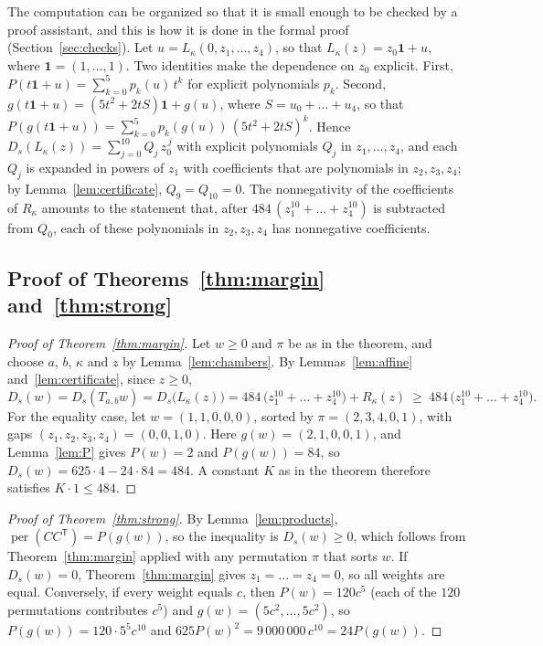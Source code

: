\documentclass[11pt,a4paper]{article}
\theoremstyle{definition}
\theoremstyle{remark}
\newcommand{\per}{\operatorname{per}}
\newcommand{\T}{\mathsf{T}}
\begin{document}
The computation can be organized so that it is small enough to be checked by a proof assistant, and this is how it is
done in the formal proof (Section~\ref{sec:checks}). Let $u=L_\kappa(0,z_1,\dots,z_4)$, so that
$L_\kappa(z)=z_0\mathbf 1+u$, where $\mathbf 1=(1,\dots,1)$. Two identities make the dependence on $z_0$
explicit. First, $P(t\mathbf1+u)=\sum_{k=0}^5p_k(u)\,t^k$ for explicit polynomials $p_k$. Second,
$g(t\mathbf1+u)=(5t^2+2tS)\mathbf1+g(u)$, where $S=u_0+\dots+u_4$, so that
$P(g(t\mathbf1+u))=\sum_{k=0}^5p_k(g(u))\,(5t^2+2tS)^k$. Hence $D_s(L_\kappa(z))=\sum_{j=0}^{10}Q_j\,z_0^{\,j}$ with
explicit polynomials $Q_j$ in $z_1,\dots,z_4$, and each $Q_j$ is expanded in powers of $z_1$ with coefficients that are
polynomials in $z_2,z_3,z_4$; by Lemma~\ref{lem:certificate}, $Q_9=Q_{10}=0$. The nonnegativity of the coefficients of
$R_\kappa$ amounts to the statement that, after $484\,(z_1^{10}+\dots+z_4^{10})$ is subtracted from $Q_0$, each of
these polynomials in $z_2,z_3,z_4$ has nonnegative coefficients.

\subsection{Proof of Theorems~\ref{thm:margin} and~\ref{thm:strong}}

\begin{proof}[Proof of Theorem~\ref{thm:margin}]
Let $w\ge0$ and $\pi$ be as in the theorem, and choose $a$, $b$, $\kappa$ and $z$ by Lemma~\ref{lem:chambers}. By
Lemmas~\ref{lem:affine} and~\ref{lem:certificate}, since $z\ge0$,
\[
D_s(w)=D_s(T_{a,b}w)=D_s\bigl(L_\kappa(z)\bigr)=484\,\bigl(z_1^{10}+\dots+z_4^{10}\bigr)+R_\kappa(z)
\ \ge\ 484\,\bigl(z_1^{10}+\dots+z_4^{10}\bigr).
\]
For the equality case, let $w=(1,1,0,0,0)$, sorted by $\pi=(2,3,4,0,1)$, with gaps $(z_1,z_2,z_3,z_4)=(0,0,1,0)$. Here
$g(w)=(2,1,0,0,1)$, and Lemma~\ref{lem:P} gives $P(w)=2$ and $P(g(w))=84$, so $D_s(w)=625\cdot4-24\cdot84=484$. A
constant $K$ as in the theorem therefore satisfies $K\cdot1\le484$.
\end{proof}

\begin{proof}[Proof of Theorem~\ref{thm:strong}]
By Lemma~\ref{lem:products}, $\per(CC^\T)=P(g(w))$, so the inequality is $D_s(w)\ge0$, which follows from
Theorem~\ref{thm:margin} applied with any permutation $\pi$ that sorts $w$. If $D_s(w)=0$, Theorem~\ref{thm:margin}
gives $z_1=\dots=z_4=0$, so all weights are equal. Conversely, if every weight equals $c$, then $P(w)=120c^5$ (each of
the $120$ permutations contributes $c^5$) and $g(w)=(5c^2,\dots,5c^2)$, so $P(g(w))=120\cdot5^5c^{10}$ and
$625P(w)^2=9\,000\,000\,c^{10}=24P(g(w))$.
\end{proof}
\end{document}

